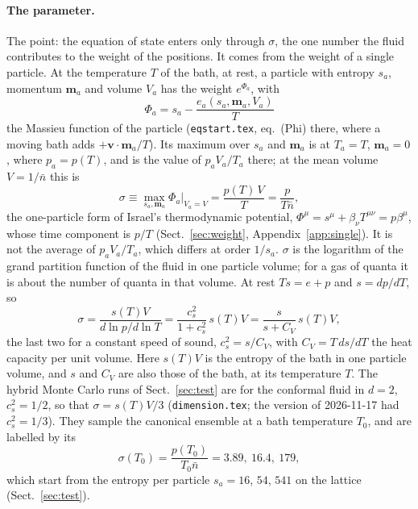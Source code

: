 \documentclass[11pt,aps,preprint,nofootinbib,superscriptaddress,tightenlines]{revtex4-2}
\def\st{\begin{equation}}
\def\stp{\end{equation}}
\def\Sect#1{Sect.~\ref{#1}}
\def\App#1{Appendix~\ref{#1}}
\let\oldparagraph\paragraph
\renewcommand{\paragraph}{\par\bigskip\oldparagraph}
\begin{document}
\paragraph{The parameter.}  The point: the equation of state enters only through $\sigma$, the one number the fluid contributes to the weight of
the positions.  It comes from the weight of a single particle.  At the temperature $T$ of the bath, at rest, a particle with entropy $s_a$, momentum $\bm m_a$
and volume $V_a$ has the weight $e^{\Phi_a}$, with
\st
\Phi_a=s_a-\frac{e_a(s_a,\bm m_a,V_a)}{T}
\label{Phia}
\stp
the Massieu function of the particle (\texttt{eqstart.tex}, eq.~(Phi) there, where a moving bath adds $+\bm v\cdot\bm m_a/T$).  Its maximum over $s_a$ and $\bm m_a$ is at
$T_a=T$, $\bm m_a=0$, where $p_a=p(T)$, and is the value of $p_aV_a/T_a$ there; at the mean volume $V=1/\bar n$ this is
\st
\sigma\equiv\max_{s_a,\bm m_a}\Phi_a\Big|_{V_a=V}=\frac{p(T)\,V}{T}=\frac p{T\bar n} ,
\stp
the one-particle form of Israel's thermodynamic potential, $\Phi^\mu=s^\mu+\beta_\nu T^{\mu\nu}=p\beta^\mu$, whose time component is $p/T$ (\Sect{sec:weight}, \App{app:single}).  It is
not the average of $p_aV_a/T_a$, which differs at order $1/s_a$.  $\sigma$ is the logarithm of the grand partition function of the fluid in one particle
volume; for a gas of quanta it is about the number of quanta in that volume.  At rest $Ts=e+p$ and $s=dp/dT$, so
\st
\sigma=\frac{s(T)V}{d\ln p/d\ln T}=\frac{c_s^2}{1+c_s^2}\,s(T)V=\frac{s}{s+C_V}\,s(T)V ,
\label{sigma}
\stp
the last two for a constant speed of sound, $c_s^2=s/C_V$, with $C_V=T\,ds/dT$ the heat capacity per unit volume.  Here $s(T)V$ is the entropy of the bath
in one particle volume, and $s$ and $C_V$ are also those of the bath, at its temperature $T$.  The hybrid Monte Carlo runs of
\Sect{sec:test} are for the conformal fluid in $d=2$, $c_s^2=1/2$, so that $\sigma=s(T)V/3$ (\texttt{dimension.tex}; the version of 2026-11-17 had
$c_s^2=1/3$).  They sample the canonical ensemble at a bath temperature $T_0$, and are labelled by its
\st
\sigma(T_0)=\frac{p(T_0)}{T_0\bar n}=3.89,\ 16.4,\ 179 ,
\stp
which start from the entropy per particle $s_a=16$, $54$, $541$ on the lattice (\Sect{sec:test}).
\end{document}
